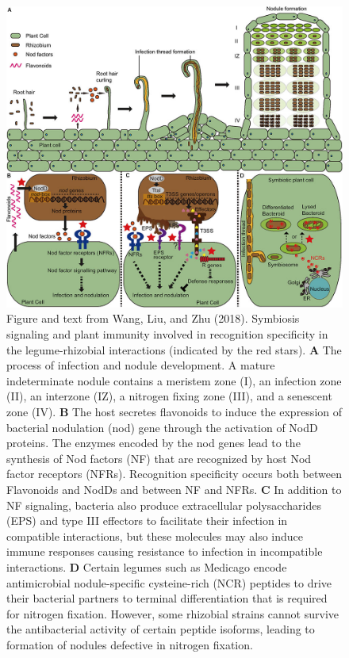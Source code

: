 \documentclass[
  letterpaper,
  DIV=11,
  numbers=noendperiod]{scrartcl}
\begin{document}
\begin{figure}

{\centering \includegraphics[width=8.33333in,height=\textheight]{images/nitrogenfixing.jpg}

}

\caption{\label{fig-nitrogenfixing}Figure and text from Wang, Liu, and
Zhu (2018). Symbiosis signaling and plant immunity involved in
recognition specificity in the legume-rhizobial interactions (indicated
by the red stars). \textbf{A} The process of infection and nodule
development. A mature indeterminate nodule contains a meristem zone (I),
an infection zone (II), an interzone (IZ), a nitrogen fixing zone (III),
and a senescent zone (IV). \textbf{B} The host secretes flavonoids to
induce the expression of bacterial nodulation (nod) gene through the
activation of NodD proteins. The enzymes encoded by the nod genes lead
to the synthesis of Nod factors (NF) that are recognized by host Nod
factor receptors (NFRs). Recognition specificity occurs both between
Flavonoids and NodDs and between NF and NFRs. \textbf{C} In addition to
NF signaling, bacteria also produce extracellular polysaccharides (EPS)
and type III effectors to facilitate their infection in compatible
interactions, but these molecules may also induce immune responses
causing resistance to infection in incompatible interactions. \textbf{D}
Certain legumes such as Medicago encode antimicrobial nodule-specific
cysteine-rich (NCR) peptides to drive their bacterial partners to
terminal differentiation that is required for nitrogen fixation.
However, some rhizobial strains cannot survive the antibacterial
activity of certain peptide isoforms, leading to formation of nodules
defective in nitrogen fixation.}

\end{figure}
\end{document}
